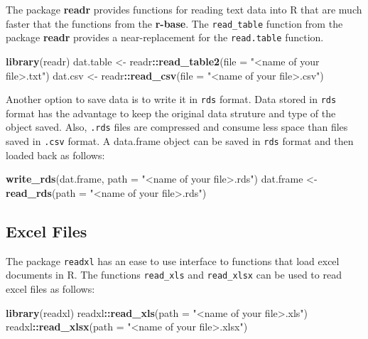 \documentclass[]{book}
\newenvironment{Shaded}{\begin{snugshade}}{\end{snugshade}}
\newcommand{\KeywordTok}[1]{\textcolor[rgb]{0.13,0.29,0.53}{\textbf{#1}}}
\newcommand{\DataTypeTok}[1]{\textcolor[rgb]{0.13,0.29,0.53}{#1}}
\newcommand{\StringTok}[1]{\textcolor[rgb]{0.31,0.60,0.02}{#1}}
\newcommand{\OperatorTok}[1]{\textcolor[rgb]{0.81,0.36,0.00}{\textbf{#1}}}
\newcommand{\NormalTok}[1]{#1}
\theoremstyle{definition}
\theoremstyle{definition}
\theoremstyle{definition}
\theoremstyle{remark}
\begin{document}
The package \textbf{readr} provides functions for reading text data into
R that are much faster that the functions from the \textbf{r-base}. The
\texttt{read\_table} function from the package \textbf{readr} provides a
near-replacement for the \texttt{read.table} function.

\begin{Shaded}
\begin{Highlighting}[]
\KeywordTok{library}\NormalTok{(readr)}
\NormalTok{dat.table <-}\StringTok{ }\NormalTok{readr}\OperatorTok{::}\KeywordTok{read_table2}\NormalTok{(}\DataTypeTok{file =} \StringTok{"<name of your file>.txt"}\NormalTok{)}
\NormalTok{dat.csv <-}\StringTok{ }\NormalTok{readr}\OperatorTok{::}\KeywordTok{read_csv}\NormalTok{(}\DataTypeTok{file =} \StringTok{"<name of your file>.csv"}\NormalTok{)}
\end{Highlighting}
\end{Shaded}

Another option to save data is to write it in \texttt{rds} format. Data
stored in \texttt{rds} format has the advantage to keep the original
data struture and type of the object saved. Also, \texttt{.rds} files
are compressed and consume less space than files saved in \texttt{.csv}
format. A data.frame object can be saved in \texttt{rds} format and then
loaded back as follows:

\begin{Shaded}
\begin{Highlighting}[]
\KeywordTok{write_rds}\NormalTok{(dat.frame, }\DataTypeTok{path =} \StringTok{"<name of your file>.rds"}\NormalTok{)}
\NormalTok{dat.frame <-}\StringTok{ }\KeywordTok{read_rds}\NormalTok{(}\DataTypeTok{path =} \StringTok{"<name of your file>.rds"}\NormalTok{)}
\end{Highlighting}
\end{Shaded}

\subsection{Excel Files}\label{excel-files}

The package \texttt{readxl} has an ease to use interface to functions
that load excel documents in R. The functions \texttt{read\_xls} and
\texttt{read\_xlsx} can be used to read excel files as follows:

\begin{Shaded}
\begin{Highlighting}[]
\KeywordTok{library}\NormalTok{(readxl)}
\NormalTok{readxl}\OperatorTok{::}\KeywordTok{read_xls}\NormalTok{(}\DataTypeTok{path =} \StringTok{"<name of your file>.xls"}\NormalTok{)}
\NormalTok{readxl}\OperatorTok{::}\KeywordTok{read_xlsx}\NormalTok{(}\DataTypeTok{path =} \StringTok{"<name of your file>.xlsx"}\NormalTok{)}
\end{Highlighting}
\end{Shaded}
\end{document}
